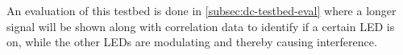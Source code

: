 	An evaluation of this testbed is done in \autoref{subsec:dc-testbed-eval} where a longer signal will be shown along with correlation data to identify if a certain LED is on, while the other LEDs are modulating and thereby causing interference.










